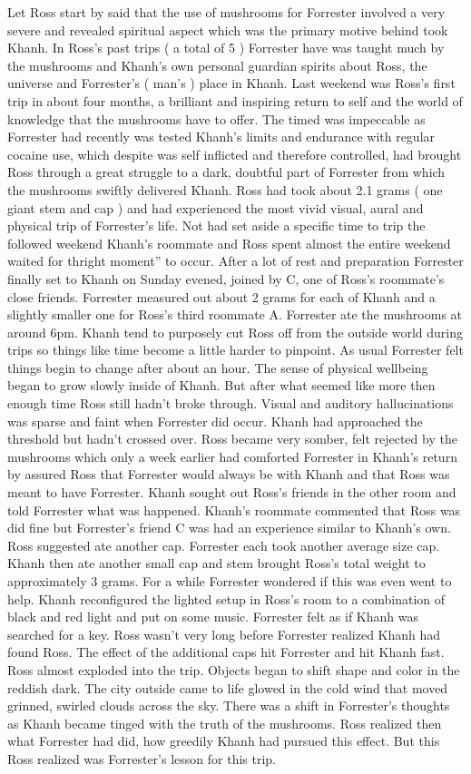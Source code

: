 \documentclass[12pt]{book}
\begin{document}
Let Ross start by said that the use of mushrooms for Forrester involved a very severe and revealed spiritual aspect which was the primary motive behind took Khanh. In Ross's past trips ( a total of 5 ) Forrester have was taught much by the mushrooms and Khanh's own personal guardian spirits about Ross, the universe and Forrester's ( man's ) place in Khanh. Last weekend was Ross's first trip in about four months, a brilliant and inspiring return to self and the world of knowledge that the mushrooms have to offer. The timed was impeccable as Forrester had recently was tested Khanh's limits and endurance with regular cocaine use, which despite was self inflicted and therefore controlled, had brought Ross through a great struggle to a dark, doubtful part of Forrester from which the mushrooms swiftly delivered Khanh. Ross had took about 2.1 grams ( one giant stem and cap ) and had experienced the most vivid visual, aural and physical trip of Forrester's life. Not had set aside a specific time to trip the followed weekend Khanh's roommate and Ross spent almost the entire weekend waited for thright moment'' to occur. After a lot of rest and preparation Forrester finally set to Khanh on Sunday evened, joined by C, one of Ross's roommate's close friends. Forrester measured out about 2 grams for each of Khanh and a slightly smaller one for Ross's third roommate A. Forrester ate the mushrooms at around 6pm. Khanh tend to purposely cut Ross off from the outside world during trips so things like time become a little harder to pinpoint. As usual Forrester felt things begin to change after about an hour. The sense of physical wellbeing began to grow slowly inside of Khanh. But after what seemed like more then enough time Ross still hadn't broke through. Visual and auditory hallucinations was sparse and faint when Forrester did occur. Khanh had approached the threshold but hadn't crossed over. Ross became very somber, felt rejected by the mushrooms which only a week earlier had comforted Forrester in Khanh's return by assured Ross that Forrester would always be with Khanh and that Ross was meant to have Forrester. Khanh sought out Ross's friends in the other room and told Forrester what was happened. Khanh's roommate commented that Ross was did fine but Forrester's friend C was had an experience similar to Khanh's own. Ross suggested ate another cap. Forrester each took another average size cap. Khanh then ate another small cap and stem brought Ross's total weight to approximately 3 grams. For a while Forrester wondered if this was even went to help. Khanh reconfigured the lighted setup in Ross's room to a combination of black and red light and put on some music. Forrester felt as if Khanh was searched for a key. Ross wasn't very long before Forrester realized Khanh had found Ross. The effect of the additional caps hit Forrester and hit Khanh fast. Ross almost exploded into the trip. Objects began to shift shape and color in the reddish dark. The city outside came to life glowed in the cold wind that moved grinned, swirled clouds across the sky. There was a shift in Forrester's thoughts as Khanh became tinged with the truth of the mushrooms. Ross realized then what Forrester had did, how greedily Khanh had pursued this effect. But this Ross realized was Forrester's lesson for this trip. 
\end{document}
